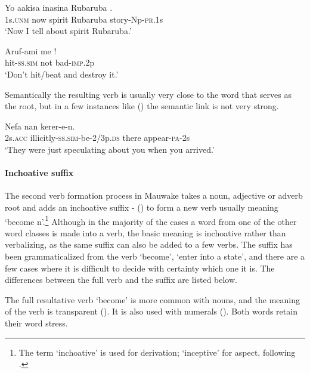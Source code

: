 \ea%
\label{ex:x188}
\gll Yo aakisa inasina Rubaruba .\\
1s.\textsc{unm} now spirit Rubaruba story-Np-\textsc{pr}.1s \\
\glt`Now I tell about spirit Rubaruba.'
\z

\ea%
\label{ex:x189}
\gll Aruf-ami me !\\
hit-\textsc{ss}.\textsc{sim} not bad-\textsc{imp}.2p \\
\glt`Don't hit/beat and destroy it.' 
\z

Semantically the resulting verb is usually very close to the word that serves as the root, but in a few instances like () the semantic link is not very strong.

\ea%
\label{ex:x190}
\gll Nefa  nan kerer-e-n. \\
2s.\textsc{acc} illicitly-\textsc{ss}.\textsc{sim}-be-2/3p.\textsc{ds} there appear-\textsc{pa}-2s \\
\glt`They were just speculating about you when you arrived.' 
\z

\paragraph[Inchoative suffix ]{Inchoative suffix} 
{}
The second verb formation process in Mauwake takes a noun, adjective or adverb root and adds an inchoative suffix - () to form a new verb usually meaning `become n'.\footnote{The term `inchoative' is used for derivation; `inceptive' for aspect, following \citet[95]{Payne1997}.} Although in the majority of the cases a word from one of the other word classes is made into a verb, the basic meaning is inchoative rather than verbalizing, as the same suffix can also be added to a few verbs. The suffix has been grammaticalized from the verb \textstyleEmphasizedVernacularWords{-} `become', `enter into a state', and there are a few cases where it is difficult to decide with certainty which one it is. The differences between the full verb and the suffix are listed below. 

The full resultative verb \textstyleEmphasizedVernacularWords{-} `become' is more common with nouns, and the meaning of the verb is transparent (). It is also used with numerals (). Both words retain their word stress.


